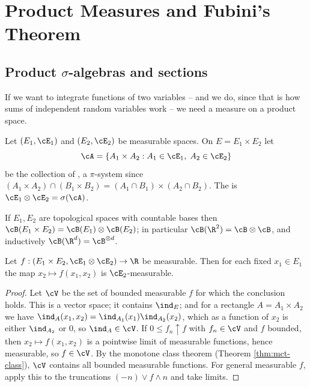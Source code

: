 \section{Product Measures and Fubini's Theorem}

\subsection{Product \texorpdfstring{$\sigma$}{sigma}-algebras and sections}

If we want to integrate functions of two variables -- and we do, since that is how sums of independent random variables work -- we need a measure on a product space.

\begin{definition}
	Let $(E_1,\cE_1)$ and $(E_2,\cE_2)$ be measurable spaces. On $E = E_1\times E_2$ let
	$$
	\cA = \{A_1\times A_2 : A_1 \in \cE_1,\; A_2 \in \cE_2\}
	$$
	be the collection of , a $\pi$-system since $(A_1\times A_2)\cap(B_1\times B_2) = (A_1\cap B_1)\times(A_2\cap B_2)$. The  is $\cE_1\otimes\cE_2 = \sigma(\cA)$.
\end{definition}

If $E_1, E_2$ are topological spaces with countable bases then $\cB(E_1\times E_2) = \cB(E_1)\otimes\cB(E_2)$; in particular $\cB(\R^2)=\cB\otimes\cB$, and inductively $\cB(\R^d) = \cB^{\otimes d}$.

\begin{lemma}\label{lem:sections}
	Let $f : (E_1\times E_2, \cE_1\otimes\cE_2)\to\R$ be measurable. Then for each fixed $x_1 \in E_1$ the map $x_2 \mapsto f(x_1,x_2)$ is $\cE_2$-measurable.
\end{lemma}
\begin{proof}
	Let $\cV$ be the set of bounded measurable $f$ for which the conclusion holds. This is a vector space; it contains $\ind_E$; and for a rectangle $A = A_1\times A_2$ we have $\ind_A(x_1,x_2) = \ind_{A_1}(x_1)\ind_{A_2}(x_2)$, which as a function of $x_2$ is either $\ind_{A_2}$ or $0$, so $\ind_A \in \cV$. If $0 \leq f_n \uparrow f$ with $f_n \in \cV$ and $f$ bounded, then $x_2\mapsto f(x_1,x_2)$ is a pointwise limit of measurable functions, hence measurable, so $f \in \cV$. By the monotone class theorem (Theorem \ref{thm:mct-class}), $\cV$ contains all bounded measurable functions. For general measurable $f$, apply this to the truncations $(-n)\vee f\wedge n$ and take limits.
\end{proof}

